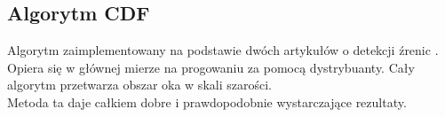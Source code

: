 \documentclass[10pt, a4paper]{article}
\begin{document}
\subsection{Algorytm CDF}
Algorytm zaimplementowany na podstawie dwóch artykułów o detekcji źrenic \cite{IMECSPupilCDFAnalysis}
\cite{EyePupilWebCam}. Opiera się w głównej mierze na progowaniu za pomocą dystrybuanty. Cały algorytm przetwarza obszar oka w skali szarości. \\
Metoda ta daje całkiem dobre i prawdopodobnie wystarczające rezultaty. \\

\begin{figure}[H]
    \begin{center}
        \hspace{3mm}

\end{center}
\end{figure}
\end{document}
